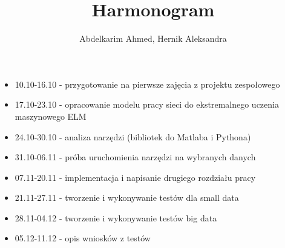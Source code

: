 \documentclass{article}
\title{Harmonogram}
\author{Abdelkarim Ahmed, Hernik Aleksandra}
\begin{document}
\maketitle
\begin{itemize}
\item 10.10-16.10 - przygotowanie na pierwsze zajęcia z projektu zespołowego
\item 17.10-23.10 - opracowanie modelu pracy sieci do ekstremalnego uczenia maszynowego ELM
\item 24.10-30.10 - analiza narzędzi (bibliotek do Matlaba i Pythona)
\item 31.10-06.11 - próba uruchomienia narzędzi na wybranych danych
\item 07.11-20.11 - implementacja i napisanie drugiego rozdziału pracy
\item 21.11-27.11 - tworzenie i wykonywanie testów dla small data
\item 28.11-04.12 - tworzenie i wykonywanie testów big data
\item 05.12-11.12 - opis wniosków z testów
\end{itemize}
\end{document}
